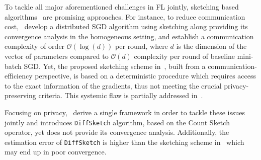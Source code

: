 \documentclass{article}
\begin{document}
To tackle all major aforementioned challenges in FL jointly, sketching based algorithms~\citep{DBLP:journals/tcs/CharikarCF04,cormode2005improved,kleinberg2003bursty,Proc:Li_Church_Hastie_NIPS08} 
are promising approaches. 
For instance, to reduce communication cost,~\citep{ivkin2019communication} develop a distributed SGD algorithm using sketching along providing its convergence analysis in the homogeneous setting, and establish a communication complexity of order $\mathcal{O}(\log(d))$ per round, where $d$ is the dimension of the vector of parameters compared to $\mathcal{O}(d)$ complexity per round of baseline mini-batch SGD. Yet, the proposed sketching scheme in~\citet{ivkin2019communication}, built from a communication-efficiency perspective, is based on a deterministic procedure which requires access to the exact information of the gradients, thus not meeting the crucial privacy-preserving criteria.
This systemic flaw is partially addressed in~\citet{rothchild2020fetchsgd}. 


Focusing on privacy,~\citep{li2019privacy} derive a single framework in order to tackle these issues jointly and introduces \texttt{DiffSketch} algorithm, based on the Count Sketch operator, yet does not provide its convergence analysis.
Additionally, the estimation error of \texttt{DiffSketch} is higher than the sketching scheme in~\citet{ivkin2019communication} which may end up in poor convergence. 
 
\end{document}
